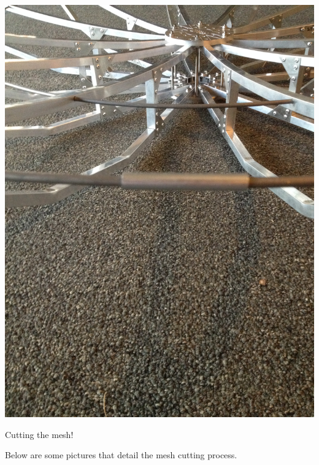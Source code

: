 \documentclass[11pt]{article} %
\begin{document}
\begin{center}
\includegraphics[scale=0.12]{dish/07.jpeg}
\end{center}

Cutting the mesh!

Below are some pictures that detail the mesh cutting process.
\end{document}
